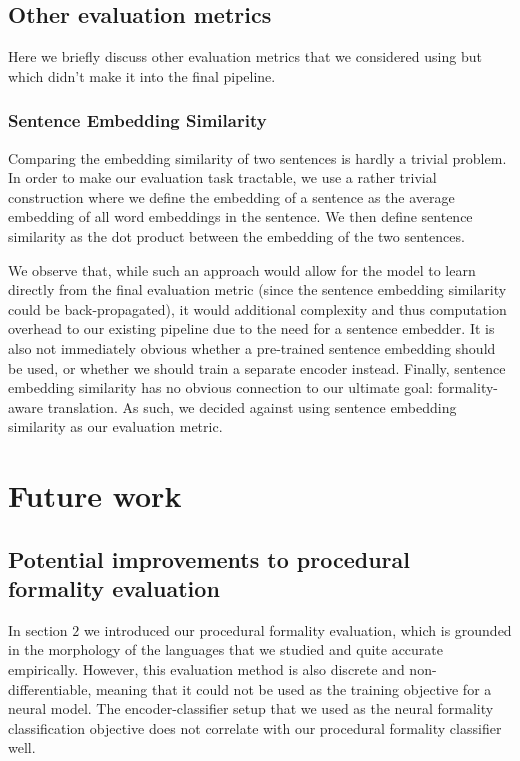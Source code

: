 \documentclass[11pt]{article}
\begin{document}
\subsection{Other evaluation metrics}

Here we briefly discuss other evaluation metrics that we considered using but which didn't make it into the final pipeline.

\subsubsection{Sentence Embedding Similarity}

Comparing the embedding similarity of two sentences is hardly a trivial problem. In order to make our evaluation task tractable, we use a rather trivial construction where we define the embedding of a sentence as the average embedding of all word embeddings in the sentence. We then define sentence similarity as the dot product between the embedding of the two sentences. 

We observe that, while such an approach would allow for the model to learn directly from the final evaluation metric (since the sentence embedding similarity could be back-propagated), it would additional complexity and thus computation overhead to our existing pipeline due to the need for a sentence embedder. It is also not immediately obvious whether a pre-trained sentence embedding should be used, or whether we should train a separate encoder instead. Finally, sentence embedding similarity has no obvious connection to our ultimate goal: formality-aware translation. As such, we decided against using sentence embedding similarity as our evaluation metric.

\section{Future work}

\subsection{Potential improvements to procedural formality evaluation}

In section $2$ we introduced our procedural formality evaluation, which is grounded in the morphology of the languages that we studied and quite accurate empirically. However, this evaluation method is also discrete and non-differentiable, meaning that it could not be used as the training objective for a neural model. The encoder-classifier setup that we used as the neural formality classification objective does not correlate with our procedural formality classifier well. 
\end{document}
